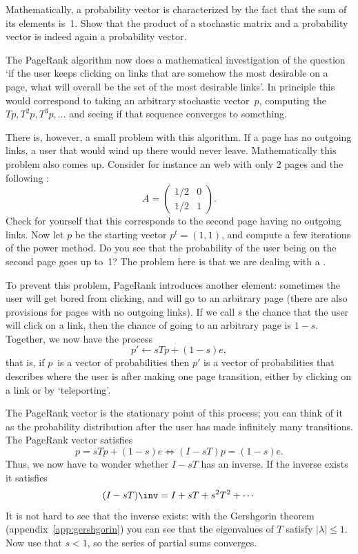 \begin{exercise}
  Mathematically, a probability vector is characterized by the fact
  that the sum of its elements is~1. Show that the product of a
  stochastic matrix and a probability vector is indeed again a
  probability vector.
\end{exercise}

The PageRank algorithm now does a mathematical investigation of the
question `if the user keeps clicking on links that are somehow the
most desirable on a page, what will overall be the set of the most
desirable links'. In principle this would correspond to taking an
arbitrary stochastic vector~$p$, computing the 
$Tp,T^2p,T^3p,\ldots$ and
seeing if that sequence converges to something.

There is, however, a small problem with this algorithm. If a page has
no outgoing links, a user that would wind up there would never
leave. Mathematically this problem also comes up. Consider for
instance an web with only 2 pages and the following
:
\[ A=
\begin{pmatrix}
  1/2&0\\ 1/2&1
\end{pmatrix}.
\]
Check for yourself that this corresponds to the second page having no
outgoing links. Now let $p$ be the starting vector $p^t=(1,1)$, and
compute a few iterations of the power method. Do you see that the
probability of the user being on the second page goes up to~1? The
problem here is that we are dealing with a
.

To prevent this problem, PageRank
introduces another element: sometimes the user
will get bored from clicking, and will go to an arbitrary page (there
are also provisions for pages with no outgoing links). If we
call $s$ the chance that the user will click on a link, then the
chance of going to an arbitrary page is $1-s$. Together, we now have
the process
\[ p'\leftarrow sTp+(1-s)e, \]
that is, if $p$~is a vector of probabilities then $p'$ is a vector of
probabilities that describes where the user is after making one page
transition, either by clicking on a link or by `teleporting'.

The PageRank vector is the stationary point of this process; you can
think of it as the probability distribution after the user has made
infinitely many transitions. The PageRank vector satisfies
\[ p=sTp+(1-s)e \Leftrightarrow (I-sT)p=(1-s)e. \]
Thus, we now have to wonder whether $I-sT$ has an inverse.
If the inverse exists it satisfies
\[ (I-sT)\inv = I+sT+s^2T^2+\cdots \]
It is not hard to see that the inverse exists: with the Gershgorin theorem
(appendix~\ref{app:gershgorin}) you can see that the eigenvalues of
$T$ satisfy $|\lambda|\leq 1$. Now use that $s<1$, so the series of
partial sums converges.

